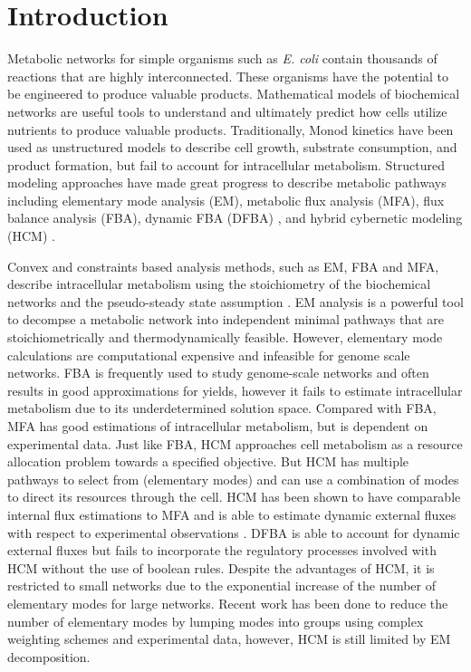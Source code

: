 \documentclass[10pt,twocolumn,twoside,final]{IEEEtran}
\begin{document}
\section{Introduction}
Metabolic networks for simple organisms such as \textit{E. coli} contain thousands of reactions that are highly interconnected.
These organisms have the potential to be engineered to produce valuable products.
Mathematical models of biochemical networks are useful tools to understand and ultimately predict how cells utilize nutrients to produce valuable products.
Traditionally, Monod kinetics have been used as unstructured models to describe cell growth, substrate consumption, and product formation, but fail to account for intracellular metabolism\cite{shuler_book}.
Structured modeling approaches have made great progress to describe metabolic pathways including elementary mode analysis (EM)\cite{2006_vonKamp_Metatool}, metabolic flux analysis (MFA), flux balance analysis (FBA)\cite{2010_orth_NatBiotech}, dynamic FBA (DFBA) \cite{1994_varma_palsson_ApplEnvMicro,2002_Mahadevan_BiophysJ}, and hybrid cybernetic modeling (HCM) \cite{2008_kim_varner_ramkrishna_BiotechProg}.

Convex and constraints based analysis methods, such as EM, FBA and MFA,
describe intracellular metabolism using the stoichiometry of the biochemical networks and the pseudo-steady state assumption \cite{2010_orth_NatBiotech}.
EM analysis is a powerful tool to decompse a metabolic network into independent minimal pathways that are stoichiometrically and thermodynamically feasible.
However, elementary mode calculations are computational expensive and infeasible for genome scale networks\cite{2004_lee_varner_ko_ieee}.
FBA is frequently used to study genome-scale networks\cite{2010_orth_NatBiotech} and often results in good approximations for yields, however it fails to estimate intracellular metabolism due to its underdetermined solution space.
Compared with FBA, MFA has good estimations of intracellular metabolism, but is dependent on experimental data.
Just like FBA, HCM approaches cell metabolism as a resource allocation problem towards a specified objective.
But HCM has multiple pathways to select from (elementary modes) and can use a combination of modes to direct its resources through the cell.
HCM has been shown to have comparable internal flux estimations to MFA and is able to estimate dynamic external fluxes with respect to experimental observations \cite{2008_kim_varner_ramkrishna_BiotechProg}.
DFBA is able to account for dynamic external fluxes but fails to incorporate the regulatory processes involved with HCM without the use of boolean rules\cite{2001_covert_schilling_palsson}.
Despite the advantages of HCM, it is restricted to small networks due to the exponential increase of the number of elementary modes for large networks.
Recent work has been done to reduce the number of elementary modes by lumping modes into groups using complex weighting schemes and experimental data\cite{2010_song_ramkrishna}, however, HCM is still limited by EM decomposition.
\end{document}
